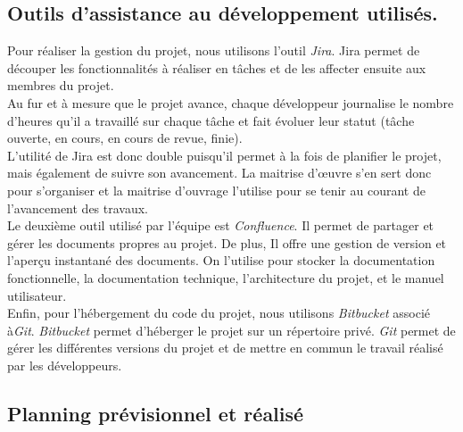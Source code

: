 
\subsection{Outils d'assistance au développement utilisés.}
Pour réaliser la gestion du projet, nous utilisons l'outil \textit{Jira}.
Jira permet de découper les fonctionnalités à réaliser en tâches et de les affecter ensuite aux membres du projet.\\
Au fur et à mesure que le projet avance, chaque développeur journalise le nombre d'heures qu'il a travaillé sur chaque tâche et fait évoluer leur statut (tâche ouverte, en cours, en cours de revue, finie).\\
L'utilité de Jira est donc double puisqu'il permet à la fois de planifier le projet, mais également de suivre son avancement. La maitrise d'œuvre s'en sert donc pour s'organiser et la maitrise d'ouvrage l'utilise pour se tenir au courant de l'avancement des travaux.\\

Le deuxième outil utilisé par l'équipe est \textit{Confluence}. Il permet de partager et gérer les documents propres au projet. De plus, Il offre une gestion de version et l'aperçu instantané des documents. On l'utilise pour stocker la documentation fonctionnelle, la documentation technique, l'architecture du projet, et le manuel utilisateur.\\

Enfin, pour l'hébergement du code du projet, nous utilisons \textit{Bitbucket} associé à\textit{Git}. \textit{Bitbucket} permet d'héberger le projet sur un répertoire privé. \textit{Git} permet de gérer les différentes versions du projet et de mettre en commun le travail réalisé par les développeurs. 


\newpage
\subsection{Planning prévisionnel et réalisé} %
